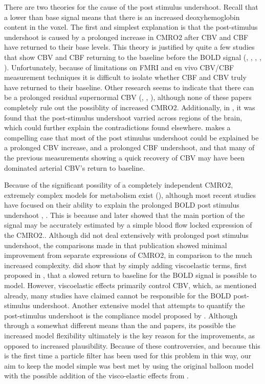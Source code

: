 \documentclass{article}
\begin{document}
There are two theories for the cause of the post stimulus undershoot. Recall
that a lower than base signal means that there is an increased deoxyhemoglobin
content in the voxel. The first and simplest explanation is that the post-stimulus
undershoot is caused by a prolonged increase in CMRO2 after CBV and CBF
have returned to their base levels. This theory is justified by quite a few
studies that show CBV and CBF returning to the baseline before the BOLD signal
(\cite{Frahm2008}, \cite{Donahue2009}, \cite{Buxton2004}, \cite{Lu2004},
\cite{Shen2008}). Unfortunately, because of limitations on FMRI and en vivo
CBV/CBF measurement techniques it is difficult to isolate whether CBF and
CBV truly have returned to their baseline. Other research seems to indicate
that there can be a prolonged residual supernormal CBV (\cite{Mandeville1999a}, 
\cite{Behzadi2005}, \cite{Chen2009a}), although none of these papers completely
rule out the possiblity of increased CMRO2. Additionally, in \cite{Yacoub2006}, it 
was found that the post-stimulus undershoot varried across regions of the brain, 
which could further explain the contradictions found elsewhere. \cite{Chen2009a}
makes a compelling case that most of the post stimulus undershoot could be 
explained be a prolonged CBV increase, and a prolonged CBF undershoot, and that
many of the previous measurements showing a quick recovery of CBV 
may have been dominated arterial CBV's return to baseline. 

Because of the significant possility of a completely independent CMRO2,
extremely complex models for metabolism exist (\cite{Zheng2005}), although 
most recent studies have
focused on their ability to explain the prolonged BOLD post stimulus 
undershoot \cite{Zheng2005}, \cite{Buxton2004}. This is because \cite{Buxton2004}
and later \cite{Riera2004} showed that the main portion of the signal may be 
accurately estimated by a simple blood flow locked expression of the CMRO2.. 
Although \cite{Deneux2006} did not deal extensively with prolonged post
stimulus undershoot, the comparisons made in that publication showed minimal
improvement from separate expressions of CMRO2, in comparison to the much 
increased complexity. \cite{Deneux2006} did show that by simply adding viscoelastic
terms, first proposed in \cite{Buxton2004}, that a slowed return to baseline for
the BOLD signal is possible to model. However, viscoelastic effects primarily
control CBV, which, as mentioned already, many studies have claimed cannot be 
responsible for the BOLD post-stimulus undershoot. Another extensive model
that attempts to quantify the post-stimulus undershoot is the compliance model 
proposed by \cite{Behzadi2005}. Although through a somewhat different means than
the \cite{Zheng2005} and \cite{Buxton2004} papers, its possible the increased
model flexibility ultimately is the key reason for the improvements, as opposed
to increased plausibility. Because of these controversies, and because this is
the first time a particle filter has been used for this problem in this way, 
our aim to keep the model simple was best met by using the original balloon
model with the possible addition of the visco-elastic effects from \cite{Buxton2004}.
\end{document}
